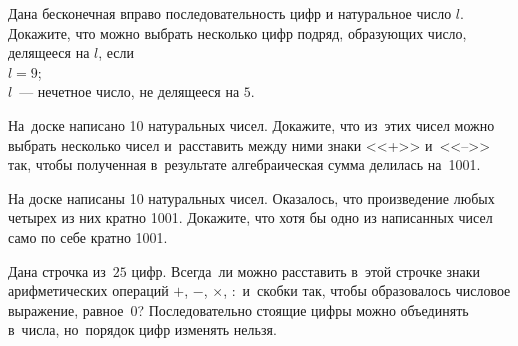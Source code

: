


\begin{problems}


\item
Дана бесконечная вправо последовательность цифр и натуральное число $l$.
Докажите, что можно выбрать несколько цифр подряд, образующих число, делящееся
на $l$, если
\\
\subproblem $l = 9$;
\\
\subproblem $l$~--- нечетное число, не делящееся на $5$.

\item
На~доске написано 10 натуральных чисел.
Докажите, что из~этих чисел можно выбрать несколько чисел и~расставить между
ними знаки <<+>> и~<<-->> так, чтобы полученная в~результате алгебраическая
сумма делилась на~1001.

\item
На доске написаны 10 натуральных чисел.
Оказалось, что произведение любых четырех из них кратно 1001.
Докажите, что хотя бы одно из написанных чисел само по себе кратно 1001.




\item
Дана строчка из~$25$ цифр.
Всегда~ли можно расставить в~этой строчке знаки арифметических операций
$+$, $-$, $\times$, $:$ и~скобки так, чтобы образовалось числовое выражение,
равное~$0$?
Последовательно стоящие цифры можно объединять в~числа, но~порядок цифр
изменять нельзя.


\end{problems}
